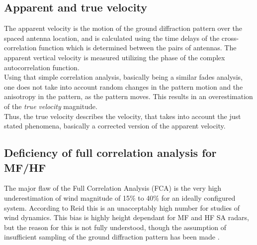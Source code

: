 \subsection{Apparent and true velocity}
The apparent velocity is the motion of the ground diffraction pattern over the spaced antenna location, and is calculated using the time delays of the cross-correlation function which is determined between the pairs of antennas. The apparent vertical velocity is measured utilizing the phase of the complex autocorrelation function. \\
Using that simple correlation analysis, basically being a similar fades analysis, one does not take into account random changes in the pattern motion and the anisotropy in the pattern, as the pattern moves. This results in an overestimation of the \textit{true velocity} magnitude. \\
Thus, the true velocity describes the velocity, that takes into account the just stated phenomena, basically a corrected version of the apparent velocity.


\subsection{Deficiency of full correlation analysis for MF/HF}

The major flaw of the Full Correlation Analysis (FCA) is the very high underestimation of wind magnitude of 15\% to 40\% for an ideally configured system. According to Reid \citep{reid2015mf} this is an unacceptably high number for studies of wind dynamics. This bias is highly height dependant for MF and HF SA radars, but the reason for this is not fully understood, though the assumption of insufficient sampling of the ground diffraction pattern has been made \citep{reid2015mf}.






